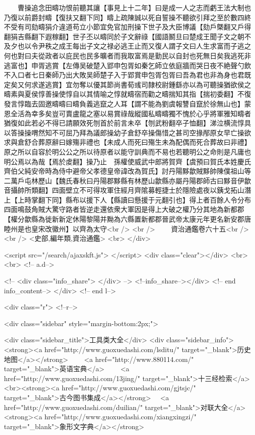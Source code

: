 　　曹操追念田疇功恨前聽其讓【事見上十二年】曰是成一人之志而虧王法大制也乃復以前爵封疇【復扶又翻下同】疇上疏陳誠以死自誓操不聽欲引拜之至於數四終不受有司劾疇狷介違道苟立小節宜免官加刑操下世子及大臣博議【劾戶槩翻又戶得翻狷吉縣翻下遐稼翻】世子丕以疇同於子文辭祿【國語鬭旦曰楚成王聞子文之朝不及夕也以令尹秩之成王每出子文之禄必逃王止而又復人謂子文曰人生求富而子逃之何也對曰夫從政者以庇民也民多曠者而我取富焉是勤民以自封也死無日矣我逃死非逃富也】申胥逃賞【左傳吴破楚入郢申包胥如秦乞師立依庭牆而哭日夜不絶聲勺飲不入口者七日秦師乃出大敗吴師楚子入于郢賞申包胥包胥曰吾為君也非為身也君既定矣又何求遂逃賞】宜勿奪以優其節尚書荀彧司隸校尉鍾繇亦以為可聽操猶欲侯之疇素與夏侯惇善操使惇自以其情喻之惇就疇宿而勸之疇揣知其指【揣初委翻】不復發言惇臨去固邀疇疇曰疇負義逃竄之人耳【謂不能為劉虞報讐自竄於徐無山也】蒙恩全活為幸多矣豈可賣盧龍之塞以易賞祿哉縱國私疇疇獨不愧於心乎將軍雅知疇者猶復如此若必不得已請願效死刎首於前言未卒【刎武粉翻卒子恤翻】涕泣横流惇具以答操操喟然知不可屈乃拜為議郎操幼子倉舒卒操傷惜之甚司空掾邴原女早亡操欲求與倉舒合葬原辭曰嫁殤非禮也【未成人而死曰殤生未為配偶而死合葬故曰非禮】原之所以自容於明公公之所以待原者以能守訓典而不易也若聽明公之命則是凡庸也明公焉以為哉【焉於䖍翻】操乃止　孫權使威武中郎將賀齊【虞預曰賀氏本姓慶氏齊伯父純安帝時為侍中避帝父孝德皇帝諱改為賀氏】討丹陽黟歙賊黟帥陳僕祖山等二萬戶屯林歷山【魏氏春秋曰丹陽郡黟縣有林歷山歙縣亦屬丹陽郡師古曰黟音伊歙音攝帥所類翻】四面壁立不可得攻軍住經月齊隂募輕捷士於隱險處夜以銕戈拓山潛上【上時掌翻下同】縣布以援下人【縣讀曰懸援于元翻引也】得上者百餘人令分布四面鳴鼓角賊大驚守路者皆逆走還依衆大軍因是得上大破之權乃分其地為新都郡【權分歙縣為徙新新定休陽黎陽并黝為六縣置新都郡晉武帝太康元年更名新安郡唐睦州是也皇宋改徽州】以齊為太守<br />
<br />
　　資治通鑑卷六十五<br />
<br />
<史部,編年類,資治通鑑>  <br>
   </div> 

<script src="/search/ajaxskft.js"> </script>
 <div class="clear"></div>
<br>
<br>
 <!-- a.d-->

 <!--
<div class="info_share">
</div> 
-->
 <!--info_share--></div>   <!-- end info_content-->
  </div> <!-- end l-->

<div class="r">   <!--r-->



<div class="sidebar"  style="margin-bottom:2px;">

 
<div class="sidebar_title">工具类大全</div>
<div class="sidebar_info">
<strong><a href="http://www.guoxuedashi.com/lsditu/" target="_blank">历史地图</a></strong>　　
<a href="http://www.880114.com/" target="_blank">英语宝典</a>　　
<a href="http://www.guoxuedashi.com/13jing/" target="_blank">十三经检索</a>　
<br><strong><a href="http://www.guoxuedashi.com/gjtsjc/" target="_blank">古今图书集成</a></strong>　
<a href="http://www.guoxuedashi.com/duilian/" target="_blank">对联大全</a>　<strong><a href="http://www.guoxuedashi.com/xiangxingzi/" target="_blank">象形文字典</a></strong>　

